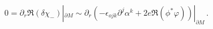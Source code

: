 \begin{equation}
0=\partial_r \Re (\delta \chi_-)|_{\partial M} \sim
\partial_r \left( -\epsilon_{ojk}
\partial^j \alpha^k + 2e \Re ( \phi^* \varphi ) \right)|_{\partial M}
\,.\label{apa2}
\end{equation}

